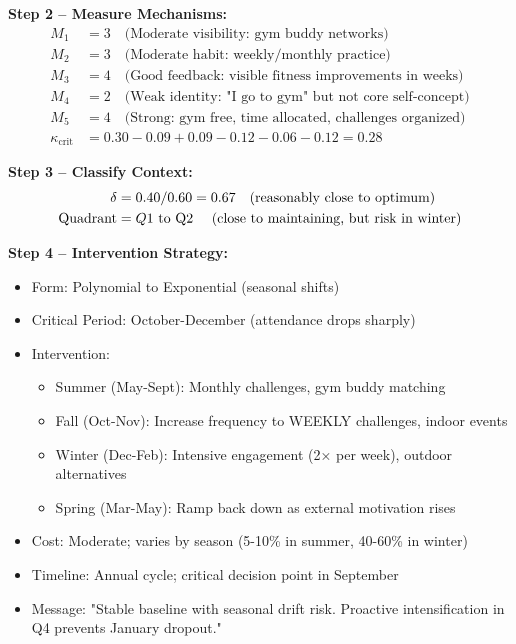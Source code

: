 \documentclass[11pt, a4paper]{article}
\begin{document}
\textbf{Step 2 – Measure Mechanisms:}
\begin{align}
M_1 &= 3 \quad \text{(Moderate visibility: gym buddy networks)} \\
M_2 &= 3 \quad \text{(Moderate habit: weekly/monthly practice)} \\
M_3 &= 4 \quad \text{(Good feedback: visible fitness improvements in weeks)} \\
M_4 &= 2 \quad \text{(Weak identity: "I go to gym" but not core self-concept)} \\
M_5 &= 4 \quad \text{(Strong: gym free, time allocated, challenges organized)} \\
\kappa_{\text{crit}} &= 0.30 - 0.09 + 0.09 - 0.12 - 0.06 - 0.12 = 0.28
\end{align}

\textbf{Step 3 – Classify Context:}
\begin{align}
\delta &= 0.40 / 0.60 = 0.67 \quad \text{(reasonably close to optimum)} \\
\text{Quadrant} &= Q1 \text{ to Q2 \quad (close to maintaining, but risk in winter)}
\end{align}

\textbf{Step 4 – Intervention Strategy:}
\begin{itemize}
    \item Form: Polynomial to Exponential (seasonal shifts)
    \item Critical Period: October-December (attendance drops sharply)
    \item Intervention:
    \begin{itemize}
        \item Summer (May-Sept): Monthly challenges, gym buddy matching
        \item Fall (Oct-Nov): Increase frequency to WEEKLY challenges, indoor events
        \item Winter (Dec-Feb): Intensive engagement (2× per week), outdoor alternatives
        \item Spring (Mar-May): Ramp back down as external motivation rises
    \end{itemize}
    \item Cost: Moderate; varies by season (5-10\% in summer, 40-60\% in winter)
    \item Timeline: Annual cycle; critical decision point in September
    \item Message: "Stable baseline with seasonal drift risk. Proactive intensification in Q4 prevents January dropout."
\end{itemize}
\end{document}
